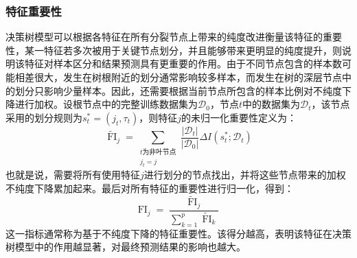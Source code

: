 \subsubsection{特征重要性}
决策树模型可以根据各特征在所有分裂节点上带来的纯度改进衡量该特征的重要性，某一特征若多次被用于关键节点划分，并且能够带来更明显的纯度提升，则说明该特征对样本区分和结果预测具有更重要的作用。由于不同节点包含的样本数可能相差很大，发生在树根附近的划分通常影响较多样本，而发生在树的深层节点中的划分只影响少量样本。因此，还需要根据当前节点所包含的样本比例对不纯度下降进行加权。设根节点中的完整训练数据集为$\mathcal{D}_0$，节点$t$中的数据集为$\mathcal{D}_t$，该节点采用的划分规则为$s_t^{\ast}=(j_t,\tau_t)$，则特征$j$的未归一化重要性定义为：
\begin{equation*}
	\widetilde{\operatorname{FI}}_j=\sum_{\substack{t\text{为非叶节点} \\ j_t=j}}\frac{|\mathcal{D}_t|}{|\mathcal{D}_0|}\Delta I(s_t^{\ast};\mathcal{D}_t)
\end{equation*}
也就是说，需要将所有使用特征$j$进行划分的节点找出，并将这些节点带来的加权不纯度下降累加起来。最后对所有特征的重要性进行归一化，得到：
\begin{equation*}
	\operatorname{FI}_j=\frac{\widetilde{\operatorname{FI}}_j}{\sum\limits_{k=1}^p\widetilde{\operatorname{FI}}_k}
\end{equation*}
这一指标通常称为基于不纯度下降的特征重要性。该得分越高，表明该特征在决策树模型中的作用越显著，对最终预测结果的影响也越大。

